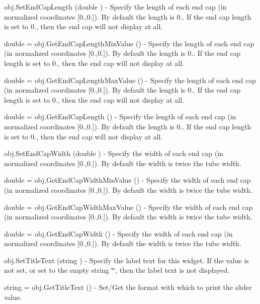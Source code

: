 \begin{DoxyItemize}
\item {\ttfamily obj.\-Set\-End\-Cap\-Length (double )} -\/ Specify the length of each end cap (in normalized coordinates \mbox{[}0.,0.\mbox{]}). By default the length is 0.. If the end cap length is set to 0., then the end cap will not display at all.  
\item {\ttfamily double = obj.\-Get\-End\-Cap\-Length\-Min\-Value ()} -\/ Specify the length of each end cap (in normalized coordinates \mbox{[}0.,0.\mbox{]}). By default the length is 0.. If the end cap length is set to 0., then the end cap will not display at all.  
\item {\ttfamily double = obj.\-Get\-End\-Cap\-Length\-Max\-Value ()} -\/ Specify the length of each end cap (in normalized coordinates \mbox{[}0.,0.\mbox{]}). By default the length is 0.. If the end cap length is set to 0., then the end cap will not display at all.  
\item {\ttfamily double = obj.\-Get\-End\-Cap\-Length ()} -\/ Specify the length of each end cap (in normalized coordinates \mbox{[}0.,0.\mbox{]}). By default the length is 0.. If the end cap length is set to 0., then the end cap will not display at all.  
\item {\ttfamily obj.\-Set\-End\-Cap\-Width (double )} -\/ Specify the width of each end cap (in normalized coordinates \mbox{[}0.,0.\mbox{]}). By default the width is twice the tube width.  
\item {\ttfamily double = obj.\-Get\-End\-Cap\-Width\-Min\-Value ()} -\/ Specify the width of each end cap (in normalized coordinates \mbox{[}0.,0.\mbox{]}). By default the width is twice the tube width.  
\item {\ttfamily double = obj.\-Get\-End\-Cap\-Width\-Max\-Value ()} -\/ Specify the width of each end cap (in normalized coordinates \mbox{[}0.,0.\mbox{]}). By default the width is twice the tube width.  
\item {\ttfamily double = obj.\-Get\-End\-Cap\-Width ()} -\/ Specify the width of each end cap (in normalized coordinates \mbox{[}0.,0.\mbox{]}). By default the width is twice the tube width.  
\item {\ttfamily obj.\-Set\-Title\-Text (string )} -\/ Specify the label text for this widget. If the value is not set, or set to the empty string \char`\"{}\char`\"{}, then the label text is not displayed.  
\item {\ttfamily string = obj.\-Get\-Title\-Text ()} -\/ Set/\-Get the format with which to print the slider value.  

\end{DoxyItemize}
